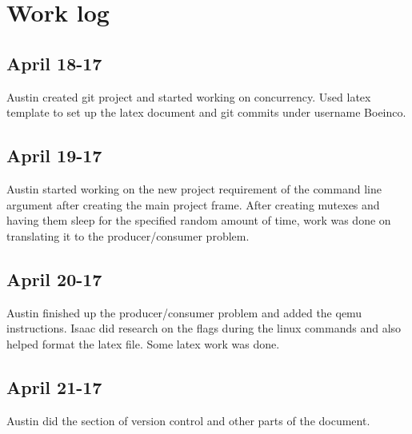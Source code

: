 \documentclass[letterpaper,10pt,titlepage]{article}
\begin{document}
\section{Work log}
\subsection{April 18-17}
Austin created git project and started working on concurrency.  Used latex template to set up the latex document and git commits under username Boeinco.
\subsection{April 19-17}
Austin started working on the new project requirement of the command line argument after creating the main project frame.  After creating mutexes and having them sleep for the specified random amount of time, work was done on translating it to the producer/consumer problem.
\subsection{April 20-17}
Austin finished up the producer/consumer problem and added the qemu instructions. Isaac did research on the flags during the linux commands and also helped format the latex file.  Some latex work was done.
\subsection{April 21-17}
Austin did the section of version control and other parts of the document.

%
%
\end{document}

